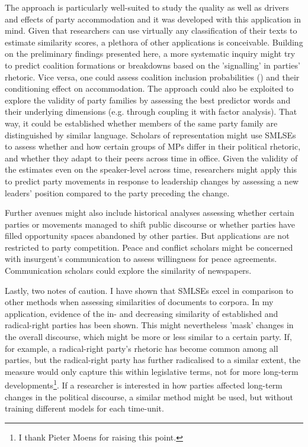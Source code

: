 \documentclass{article}
\begin{document}
The approach is particularly well-suited to study the quality as well as drivers and effects of party accommodation and it was developed with this application in mind. Given that researchers can use virtually any classification of their texts to estimate similarity scores, a plethora of other applications is conceivable. Building on the preliminary findings presented here, a more systematic inquiry might try to predict coalition formations or breakdowns based on the 'signalling' in parties' rhetoric. Vice versa, one could assess coalition inclusion probabilities (\cite{Kayser2019Coalition}) and their conditioning effect on accommodation. The approach could also be exploited to explore the validity of party families by assessing the best predictor words and their underlying dimensions (e.g. through coupling it with factor analysis). That way, it could be established whether members of the same party family are distinguished by similar language. Scholars of representation might use SMLSEs to assess whether and how certain groups of MPs differ in their political rhetoric, and whether they adapt to their peers across time in office. Given the validity of the estimates even on the speaker-level across time, researchers might apply this to predict party movements in response to leadership changes by assessing a new leaders' position compared to the party preceding the change. \par

Further avenues might also include historical analyses assessing whether certain parties or movements managed to shift public discourse or whether parties have filled opportunity spaces abandoned by other parties. But applications are not restricted to party competition. Peace and conflict scholars might be concerned with insurgent's communication to assess willingness for peace agreements. Communication scholars could explore the similarity of newspapers. \par

Lastly, two notes of caution. I have shown that SMLSEs excel in comparison to other methods when assessing similarities of documents to corpora. In my application, evidence of the in- and decreasing similarity of established and radical-right parties has been shown. This might nevertheless 'mask' changes in the overall discourse, which might be more or less similar to a certain party. If, for example, a radical-right party's rhetoric has become common among all parties, but the radical-right party has further radicalised to a similar extent, the measure would only capture this within legislative terms, not for more long-term developments\footnote{I thank Pieter Moens for raising this point.}. If a researcher is interested in how parties affected long-term changes in the political discourse, a similar method might be used, but without training different models for each time-unit.\par
\end{document}
